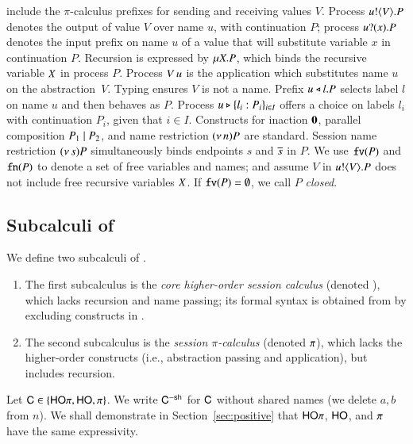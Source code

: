 include the
$\pi$-calculus prefixes for sending and receiving values $V$.
Process $u ! \langle V \rangle . P$ denotes the output of value $V$
over name $u$, with continuation $P$;
process $u ? (x) . P$ denotes the input prefix on name $u$ of a value
that 
will substitute variable $x$ in continuation $P$. 
Recursion is expressed by $\mu X. P$,
which binds the recursive variable $X$ in process $P$.
Process 
$V\, {u}$ 
is the application
which substitutes name $u$ on the abstraction~$V$. 
Typing  ensures  $V$ is not a name.
Prefix $u \triangleleft l . P$ selects label $l$ on name $u$ and then behaves as $P$.
Process $u \triangleright \{l_i: P_i\}_{i \in I}$ offers a choice on labels $l_i$ with
continuation $P_i$, given that $i \in I$.
Constructs for 
inaction $\mathbf{0}$,  parallel composition $P_1 \;|\; P_2$, and 
name restriction $(\nu\, n) P$ are standard.
Session name restriction $(\nu\, s) P$ simultaneously binds endpoints $s$ and $\overline{s}$ in $P$.
We use $\mathtt{fv}(P)$ and $\mathtt{fn}(P)$ to denote a set of free 
variables and names; 
and assume $V$ in $u ! \langle V \rangle .{P}$ does not include free recursive 
variables $X$. 
If $\mathtt{fv}(P) = \emptyset$, we call $P$ {\em closed}.

\subsection{Subcalculi of \HOp}
\label{subsec:subcalculi}
\noi
We define two subcalculi of \HOp. 
\begin{enumerate}[$\bullet$]
	\item	The first subcalculus is the 
		{\em core higher-order session calculus} (denoted \HO),
		which lacks recursion and name passing; its 
		formal syntax is obtained from  by excluding 
		constructs in .

	\item	The second subcalculus is 
		the {\em session $\pi$-calculus} 
		(denoted $\pi$), which 
		lacks  the
		higher-order constructs
		(i.e., abstraction passing and application), but includes recursion.

\end{enumerate}
%
Let $\mathsf{C} \in \{\mathsf{HO}\pi, \mathsf{HO}, \pi\}$. We write 
$\mathsf{C}^{-\mathsf{sh}}$ for $\mathsf{C}$ without shared names
(we delete $a,b$ from $n$). 
We shall demonstrate in Section~\ref{sec:positive} that 
$\mathsf{HO}\pi$, $\mathsf{HO}$, and $\pi$ have the same expressivity.


